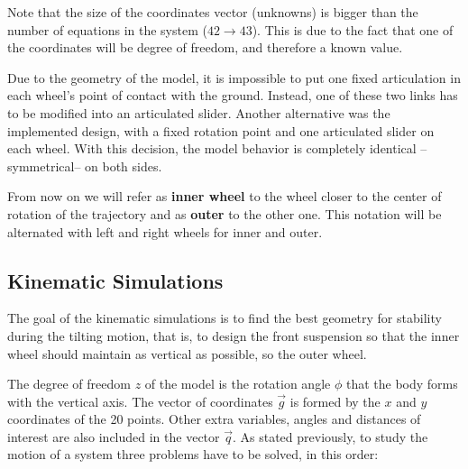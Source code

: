 Note that the size of the coordinates vector (unknowns) is bigger than the number of equations in the system ($42\rightarrow43$). This is due to the fact that one of the coordinates will be degree of freedom, and therefore a known value.

Due to the geometry of the model, it is impossible to put one fixed articulation in each wheel's point of contact with the ground. Instead, one of these two links has to be modified into an articulated slider. Another alternative was the implemented design, with a fixed rotation point and one articulated slider on each wheel. With this decision, the model behavior is completely identical  --symmetrical-- on both sides.

From now on we will refer as \textbf{inner wheel} to the wheel closer to the center of rotation of the trajectory and as \textbf{outer} to the other one. This notation will be alternated with left and right wheels for inner and outer.


\newpage
\subsection{Kinematic Simulations}

The goal of the kinematic simulations is to find the best geometry for stability during the tilting motion, that is, to design the front suspension so that the inner wheel should maintain as vertical as possible, so the outer wheel.

The degree of freedom $z$ of the model is the rotation angle $\phi$ that the body forms with the vertical axis. The vector of coordinates $\vec{g}$ is formed by the $x$ and $y$ coordinates of the 20 points. Other extra variables, angles and distances of interest are also included in the vector $\vec{q}$. As stated previously, to study the motion of a system three problems have to be solved, in this order:

